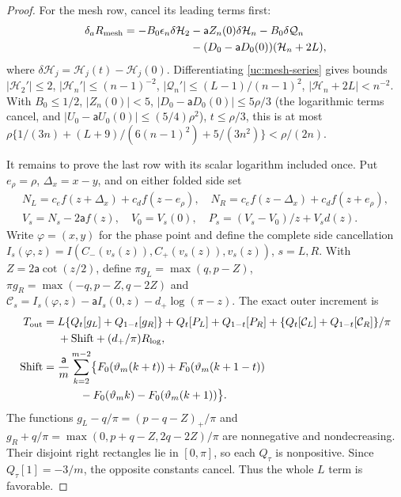 \begin{proof}
For the mesh row, cancel its leading terms first:
\[
 \begin{aligned}
 \delta_aR_{\rm mesh}=-B_0\epsilon_n\delta\mathcal H_2
 &-\mathsf{a}Z_n(0)\delta\mathcal H_n-B_0\delta\mathcal Q_n\\
 &-(D_0-\mathsf{a}D_0(0))(\mathcal H_n+2L),
 \end{aligned}
\]
where $\delta\mathcal H_j=\mathcal H_j(t)-\mathcal H_j(0)$.
Differentiating \eqref{uc:mesh-series} gives bounds
$|\mathcal H_2'|\leq2$, $|\mathcal H_n'|\leq(n-1)^{-2}$,
$|\mathcal Q_n'|\leq(L-1)/(n-1)^2$, $|\mathcal H_n+2L|<n^{-2}$.
With $B_0\leq1/2$, $|Z_n(0)|<5$,
$|D_0-\mathsf{a}D_0(0)|\leq5\rho/3$
(the logarithmic terms cancel, and
$|U_0-\mathsf aU_0(0)|\leq(5/4)\rho^2$), $t\leq\rho/3$, this is at most
$\rho\{1/(3n)+(L+9)/(6(n-1)^2)+5/(3n^2)\}<\rho/(2n)$.

It remains to prove the last row with its scalar logarithm included
once. Put $e_\rho=\rho$, $\Delta_x=x-y$, and on either folded side set
\[
 \begin{gathered}
 N_L=c_ef(z+\Delta_x)+c_df(z-e_\rho),\quad
 N_R=c_ef(z-\Delta_x)+c_df(z+e_\rho),\\
 V_s=N_s-2\mathsf{a}f(z),\quad V_0=V_s(0),
 \quad P_s=(V_s-V_0)/z+V_sd(z).
 \end{gathered}
\]
Write $\varphi=(x,y)$ for the phase point and define the complete side cancellation
$I_s(\varphi,z)=I(C_-(v_s(z)),C_+(v_s(z)),v_s(z))$, $s=L,R$.
With $Z=2\mathsf{a}\cot(z/2)$, define
$\pi g_L=\max(q,p-Z)$, $\pi g_R=\max(-q,p-Z,q-2Z)$ and
$\mathcal C_s=I_s(\varphi,z)-\mathsf{a}I_s(0,z)-d_+\log(\pi-z)$.
The exact outer increment is
\begin{align}\label{uc:signed-outer}
 T_{\rm out}={}&L\{Q_t[g_L]+Q_{1-t}[g_R]\}
 +Q_t[P_L]+Q_{1-t}[P_R]
 +\{Q_t[\mathcal C_L]+Q_{1-t}[\mathcal C_R]\}/\pi\notag\\
 &+\mathrm{Shift}+(d_+/\pi)R_{\log},\notag\\
 \mathrm{Shift}={}&\frac {\mathsf{a}}{m}\sum_{k=2}^{m-2}
 \bigl\{F_0(\vartheta_m(k+t))+F_0(\vartheta_m(k+1-t))\notag\\
 &\qquad-F_0(\vartheta_m k)-F_0(\vartheta_m(k+1))\bigr\}.
\end{align}
The functions $g_L-q/\pi=(p-q-Z)_+/\pi$ and
$g_R+q/\pi=\max(0,p+q-Z,2q-2Z)/\pi$ are nonnegative and
nondecreasing. Their disjoint right rectangles lie in $[0,\pi]$,
so each $Q_\tau$ is nonpositive. Since $Q_\tau[1]=-3/m$,
the opposite constants cancel. Thus the whole $L$ term is favorable.


\end{proof}
